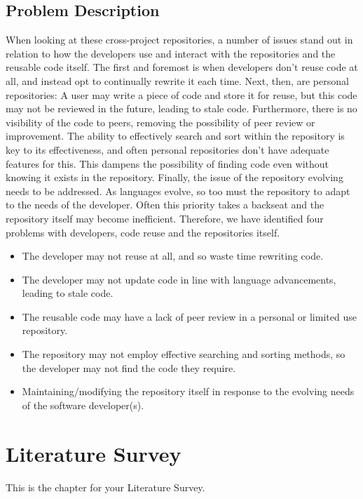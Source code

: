 \documentclass[11pt,openright,a4paper]{report}
\begin{document}
\section{Problem Description}
When looking at these cross-project repositories, a number of issues stand out in relation to how the developers use and interact with the repositories and the reusable code itself. The first and foremost is when developers don’t reuse code at all, and instead opt to continually rewrite it each time.
Next, then, are personal repositories: A user may write a piece of code and store it for reuse, but this code may not be reviewed in the future, leading to stale code. Furthermore, there is no visibility of the code to peers, removing the possibility of peer review or improvement.
The ability to effectively search and sort within the repository is key to its effectiveness, and often personal repositories don’t have adequate features for this. This dampens the possibility of finding code even without knowing it exists in the repository.
Finally, the issue of the repository evolving needs to be addressed. As languages evolve, so too must the repository to adapt to the needs of the developer. Often this priority takes a backseat and the repository itself may become inefficient. Therefore, we have identified four problems with developers, code reuse and the repositories itself.

\begin{itemize}
\item The developer may not reuse at all, and so waste time rewriting code.
\item The developer may not update code in line with language advancements, leading to stale code. 
\item The reusable code may have a lack of peer review in a personal or limited use repository.
\item The repository may not employ effective searching and sorting methods, so the developer may not find the code they require.
\item Maintaining/modifying the repository itself in response to the evolving needs of the software developer(s). 
\end{itemize}

\chapter{Literature Survey}
%
This is the chapter for your Literature Survey.
\end{document}
